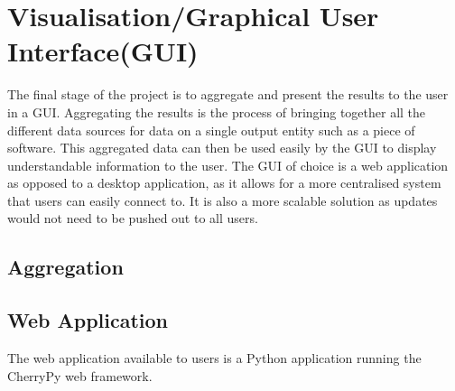 
\section[Visualisation]{Visualisation/Graphical User Interface(GUI)}
The final stage of the project is to aggregate and present the results to the user in a GUI.
Aggregating the results is the process of bringing together all the different data sources for data on a single output entity such as a piece of software. This aggregated data can then be used easily by the GUI to display understandable information to the user.
The GUI of choice is a web application as opposed to a desktop application, as it allows for a more centralised system that users can easily connect to. It is also a more scalable solution as updates would not need to be pushed out to all users.

\subsection{Aggregation}

\subsection{Web Application}
The web application available to users is a Python application running the CherryPy web framework.
